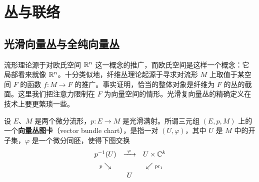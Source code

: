 
\chapter{丛与联络}


\section{光滑向量丛与全纯向量丛}

流形理论源于对欧氏空间 $\mathbb{R}^n$ 这一概念的推广，而欧氏空间是这样一个概念：它局部看来就像 $\mathbb{R}^n$。十分类似地，纤维丛理论起源于寻求对流形 $M$ 上取值于某空间 $F$ 的函数 $f\colon M\to F$ 的推广。事实证明，恰当的整体对象是纤维为 $F$ 的丛的截面。这里我们把注意力限制在 $F$ 为向量空间的情形。光滑复向量丛的精确定义在技术上要更繁琐一些。

\begin{definition}[3.1]
设 $E$、$M$ 是两个微分流形，$p\colon E\to M$ 是光滑满射。所谓三元组 $(E,p,M)$ 上的一个\textbf{向量丛图卡}（vector bundle chart），是指一对 $(U,\varphi)$，其中 $U$ 是 $M$ 中的开子集，$\varphi$ 是一个微分同胚，使得下图交换
\[
\begin{array}{ccc}
p^{-1}(U) & \xrightarrow{\ \varphi\ } & U\times\mathbb{C}^{k}\\[4pt]
{\scriptstyle p}\searrow & & \swarrow{\scriptstyle \mathrm{pr}_1}\\[2pt]
& U &
\end{array}
\]
\end{definition}

